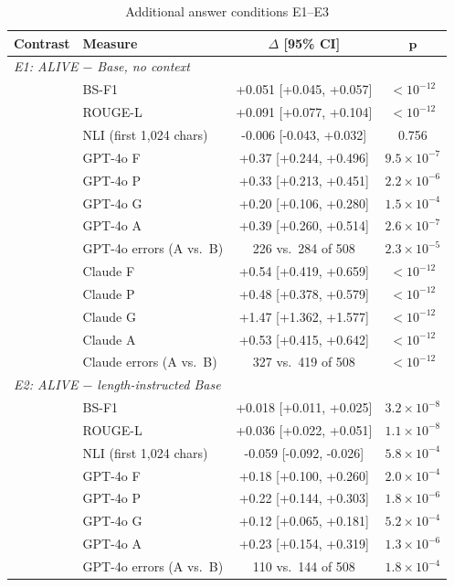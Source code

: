 \begin{table}[!htbp]
\centering
\caption{Additional answer conditions E1--E3}
\label{tab:sup_extra}
\small
\begin{tabular}{llcc}
\toprule
\textbf{Contrast} & \textbf{Measure} & \textbf{$\Delta$ [95\% CI]} & $\boldsymbol{p}$ \\
\midrule
\multicolumn{4}{l}{\textit{E1: ALIVE $-$ Base, no context}} \\
& BS-F1 & +0.051 [+0.045, +0.057] & $<10^{-12}$ \\
& ROUGE-L & +0.091 [+0.077, +0.104] & $<10^{-12}$ \\
& NLI (first 1,024 chars) & -0.006 [-0.043, +0.032] & 0.756 \\
& GPT-4o F & +0.37 [+0.244, +0.496] & $9.5{\times}10^{-7}$ \\
& GPT-4o P & +0.33 [+0.213, +0.451] & $2.2{\times}10^{-6}$ \\
& GPT-4o G & +0.20 [+0.106, +0.280] & $1.5{\times}10^{-4}$ \\
& GPT-4o A & +0.39 [+0.260, +0.514] & $2.6{\times}10^{-7}$ \\
& GPT-4o errors (A vs.\ B) & 226 vs.\ 284 of 508 & $2.3{\times}10^{-5}$ \\
& Claude F & +0.54 [+0.419, +0.659] & $<10^{-12}$ \\
& Claude P & +0.48 [+0.378, +0.579] & $<10^{-12}$ \\
& Claude G & +1.47 [+1.362, +1.577] & $<10^{-12}$ \\
& Claude A & +0.53 [+0.415, +0.642] & $<10^{-12}$ \\
& Claude errors (A vs.\ B) & 327 vs.\ 419 of 508 & $<10^{-12}$ \\
\multicolumn{4}{l}{\textit{E2: ALIVE $-$ length-instructed Base}} \\
& BS-F1 & +0.018 [+0.011, +0.025] & $3.2{\times}10^{-8}$ \\
& ROUGE-L & +0.036 [+0.022, +0.051] & $1.1{\times}10^{-8}$ \\
& NLI (first 1,024 chars) & -0.059 [-0.092, -0.026] & $5.8{\times}10^{-4}$ \\
& GPT-4o F & +0.18 [+0.100, +0.260] & $2.0{\times}10^{-4}$ \\
& GPT-4o P & +0.22 [+0.144, +0.303] & $1.8{\times}10^{-6}$ \\
& GPT-4o G & +0.12 [+0.065, +0.181] & $5.2{\times}10^{-4}$ \\
& GPT-4o A & +0.23 [+0.154, +0.319] & $1.3{\times}10^{-6}$ \\
& GPT-4o errors (A vs.\ B) & 110 vs.\ 144 of 508 & $1.8{\times}10^{-4}$ \\

\end{tabular}
\end{table}
